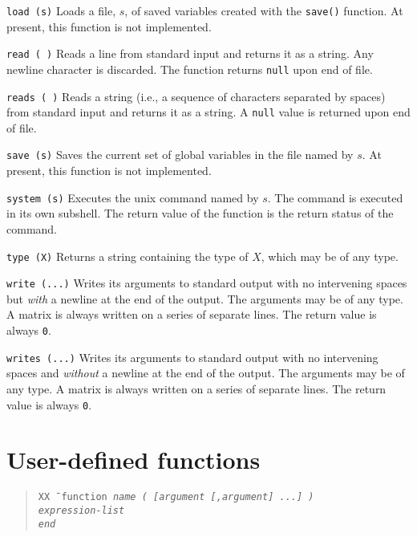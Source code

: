 \begin{dispitems}
\item[\tt load (s)]
Loads a file, $s$, of saved variables created with the {\tt save()}
function.  At present, this function is not implemented.

\item[\tt read ( )]
Reads a line from standard input and returns it as a string.  Any
newline character is discarded.  The function returns {\tt null} upon
end of file.

\item[\tt reads ( )]
Reads a string (i.e., a sequence of characters separated by spaces)
from standard input and returns it as a string.  A {\tt null} value is
returned upon end of file.

\item[\tt save (s)]
Saves the current set of global variables in the file named by $s$.
At present, this function is not implemented.

\item[\tt system (s)]
Executes the {\sc unix} command named by $s$.  The command is executed
in its own subshell.  The return value of the function is the return
status of the command.

\item[\tt type (X)]
Returns a string containing the type of $X$, which may be of any type.

\item[\tt write (...)]
Writes its arguments to standard output with no intervening spaces but
{\em with} a newline at the end of the output.  The arguments may be
of any type.  A matrix is always written on a series of separate lines.
The return value is always {\tt 0}.

\item[\tt writes (...)]
Writes its arguments to standard output with no intervening spaces and
{\em without} a newline at the end of the output.  The arguments may be
of any type.  A matrix is always written on a series of separate lines.
The return value is always {\tt 0}.

\end{dispitems}


\section{User-defined functions}
\label{burlap.syntax.functions}

\begin{quote}
\begin{tabbing}
\tt XX \= \kill
\tt function \it name \tt ( \rm [\it argument \rm [\tt,\it argument\rm] ...]
\tt ) \\
\> \it expression-list \\
\tt end
\end{tabbing}
\end{quote}

